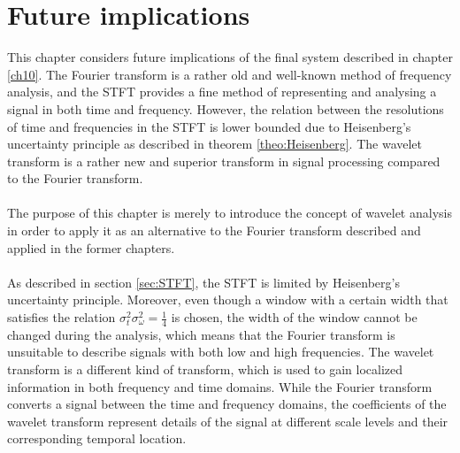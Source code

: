 \chapter{Future implications} \label{ch14}
This chapter considers future implications of the final system described in chapter \ref{ch10}. The Fourier transform is a rather old and well-known method of frequency analysis, and the STFT provides a fine method of representing and analysing a signal in both time and frequency. However, the relation between the resolutions of time and frequencies in the STFT is lower bounded due to Heisenberg's uncertainty principle as described in theorem \ref{theo:Heisenberg}. The wavelet transform is a rather new and superior transform in signal processing compared to the Fourier transform.
\\ \\
The purpose of this chapter is merely to introduce the concept of wavelet analysis in order to apply it as an alternative to the Fourier transform described and applied in the former chapters.
\\ \\
As described in section \ref{sec:STFT}, the STFT is limited by Heisenberg's uncertainty principle. Moreover, even though a window with a certain width that satisfies the relation $\sigma_t^2 \sigma_\omega^2 = \frac{1}{4}$ is chosen, the width of the window cannot be changed during the analysis, which means that the Fourier transform is unsuitable to describe signals with both low and high frequencies. The wavelet transform is a different kind of transform, which is used to gain localized information in both frequency and time domains. While the Fourier transform converts a signal between the time and frequency domains, the coefficients of the wavelet transform represent details of the signal at different scale levels and their corresponding temporal location.
